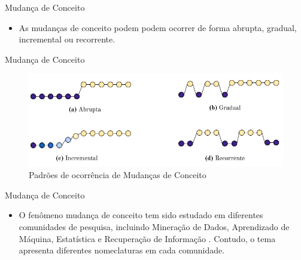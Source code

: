 \documentclass[10pt]{beamer}
\begin{document}
\begin{frame}{Mudança de Conceito}
    \begin{itemize}
        \item<1 -> As mudanças de conceito podem podem ocorrer de forma abrupta, gradual, incremental ou recorrente.
    \end{itemize}
\end{frame}

\begin{frame}{Mudança de Conceito}
\begin{figure}[H]
    \begin{center}
        \includegraphics[scale=0.5]{imagens/concept_drift_patterns.png}
        \caption{Padrões de ocorrência de Mudanças de Conceito}
        \label{fig:concept_drift_patterns}
    \end{center}
    \end{figure}
\end{frame}

\begin{frame}{Mudança de Conceito}
    \begin{itemize}
        \item<1 -> O fenômeno mudança de conceito tem sido estudado em diferentes comunidades de pesquisa, incluindo Mineração de Dados, Aprendizado de Máquina, Estatística e Recuperação de Informação \cite{Zliobaite:2010}. Contudo, o tema apresenta diferentes nomeclaturas em cada comunidade.
    \end{itemize}
\end{frame}
\end{document}
